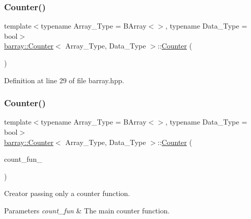 \subsubsection{\texorpdfstring{Counter()}{Counter()}\hspace{0.1cm}{\footnotesize\ttfamily [1/3]}}
{\footnotesize\ttfamily template$<$typename Array\+\_\+\+Type  = B\+Array$<$$>$, typename Data\+\_\+\+Type  = bool$>$ \\
\hyperlink{classbarray_1_1_counter}{barray\+::\+Counter}$<$ Array\+\_\+\+Type, Data\+\_\+\+Type $>$\+::\hyperlink{classbarray_1_1_counter}{Counter} (\begin{DoxyParamCaption}{ }\end{DoxyParamCaption})\hspace{0.3cm}{\ttfamily [inline]}}



Definition at line 29 of file barray.\+hpp.

\mbox{\label{classbarray_1_1_counter_a3840e841d0a985a685bdee5e9e735446}} 
\subsubsection{\texorpdfstring{Counter()}{Counter()}\hspace{0.1cm}{\footnotesize\ttfamily [2/3]}}
{\footnotesize\ttfamily template$<$typename Array\+\_\+\+Type  = B\+Array$<$$>$, typename Data\+\_\+\+Type  = bool$>$ \\
\hyperlink{classbarray_1_1_counter}{barray\+::\+Counter}$<$ Array\+\_\+\+Type, Data\+\_\+\+Type $>$\+::\hyperlink{classbarray_1_1_counter}{Counter} (\begin{DoxyParamCaption}\item[{\hyperlink{namespacebarray_a94903bd0f37708633933ea88ac8e4c6a}{Counter\+\_\+fun\+\_\+type}$<$ Array\+\_\+\+Type, Data\+\_\+\+Type $>$}]{count\+\_\+fun\+\_\+ }\end{DoxyParamCaption})\hspace{0.3cm}{\ttfamily [inline]}}



Creator passing only a counter function. 


\begin{DoxyParams}{Parameters}
{\em count\+\_\+fun} & The main counter function. \\
\hline
\end{DoxyParams}


